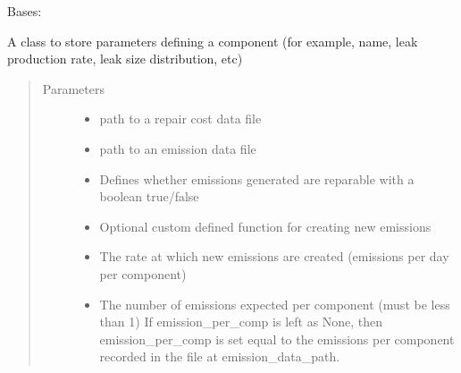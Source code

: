 \documentclass[letterpaper,10pt,english]{sphinxmanual}
\begin{document}
\begin{fulllineitems}
\label{\detokenize{index:feast.EmissionSimModules.infrastructure_classes.Component}}
Bases: 

A class to store parameters defining a component (for example, name, leak production rate, leak size
distribution, etc)
\begin{quote}\begin{description}
\item[{Parameters}] \leavevmode\begin{itemize}
\item {} 
 \textendash{} path to a repair cost data file

\item {} 
 \textendash{} path to an emission data file

\item {} 
 \textendash{} Defines whether emissions generated are reparable with a boolean true/false

\item {} 
 \textendash{} Optional custom defined function for creating new emissions

\item {} 
 \textendash{} The rate at which new emissions are created (emissions per day per component)

\item {} 
 \textendash{} The number of emissions expected per component (must be less than 1)
If emission\_per\_comp is left as None, then emission\_per\_comp is set equal to the emissions per component
recorded in the file at emission\_data\_path.


\end{itemize}
\end{description}
\end{quote}
\end{fulllineitems}
\end{document}
